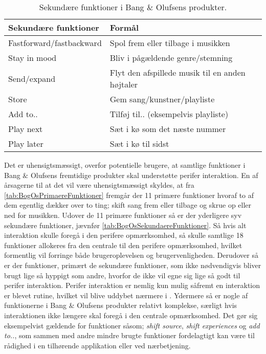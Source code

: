 \noindent
%
%
\begin{table}[H]
	\centering
	\begin{tabular}{ | l | p{8cm} |}
		\hline
		\multicolumn{1}{|l|}{\textbf{Sekundære funktioner}} & \multicolumn{1}{l|}{\textbf{Formål}} \\ \hline
		Fastforward/fastbackward & Spol frem eller tilbage i musikken \\ \hline
		Stay in mood & Bliv i pågældende genre/stemning \\ \hline
		Send/expand & Flyt den afspillede musik til en anden højtaler \\ \hline
		Store & Gem sang/kunstner/playliste \\ \hline
		Add to.. & Tilføj til.. (eksempelvis playliste) \\ \hline
		Play next & Sæt i kø som det næste nummer \\ \hline
		Play later & Sæt i kø til sidst \\ \hline
	\end{tabular}
	\caption{Sekundære funktioner i Bang $\&$ Olufsens produkter.}
	\label{tab:BogOsSekundaereFunktioner}
\end{table}
\noindent
%
Det er uhensigtsmæssigt, overfor potentielle brugere, at samtlige funktioner i Bang $\&$ Olufsens fremtidige produkter skal understøtte perifer interaktion. En af årsagerne til at det vil være uhensigtsmæssigt skyldes, at fra \autoref{tab:BogOsPrimaereFunktioner} fremgår der 11 primære funktioner hvoraf to af dem egentlig dækker over to ting; skift sang frem eller tilbage og skrue op eller ned for musikken. Udover de 11 primære funktioner så er der yderligere syv sekundære funktioner, jævnfør \autoref{tab:BogOsSekundaereFunktioner}. Så hvis alt interaktion skulle foregå i den perifere opmærksomhed, så skulle samtlige 18 funktioner allokeres fra den centrale til den perifere opmærksomhed, hvilket formentlig vil forringe både brugeroplevelsen og brugervenligheden. Derudover så er der funktioner, primært de sekundære funktioner, som ikke nødvendigvis bliver brugt lige så hyppigt som andre, hvorfor de ikke vil egne sig lige så godt til perifer interaktion. Perifer interaktion er nemlig kun mulig såfremt en interaktion er blevet rutine, hvilket vil blive uddybet nærmere i . Ydermere så er nogle af funktionerne i Bang $\&$ Olufsens produkter relativt komplekse, særligt hvis interaktionen ikke længere skal foregå i den centrale opmærksomhed. Det gør sig eksempelvist gældende for funktioner såsom; \textit{shift source}, \textit{shift experiences} og \textit{add to..}, som sammen med andre mindre brugte funktioner fordelagtigt kan være til rådighed i en tilhørende applikation eller ved nærbetjening.  

